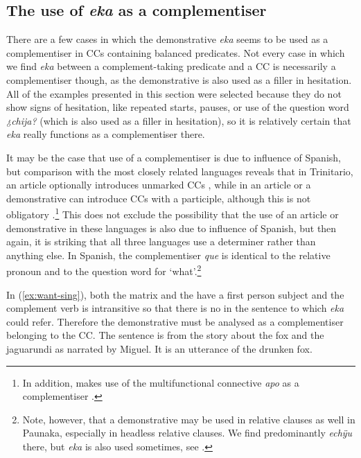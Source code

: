 \subsection{The use of \textit{eka} as a complementiser}\label{sec:CC_CMPL}

There are a few cases in which the demonstrative \textit{eka} seems to be used as a complementiser in CCs containing balanced predicates. Not every case in which we find \textit{eka} between a complement-taking predicate and a CC is necessarily a complementiser though, as the demonstrative is also used as a filler in hesitation. All of the examples presented in this section were selected because they do not show signs of hesitation, like repeated starts, pauses, or use of the question word \textit{¿chija?} (which is also used as a filler in hesitation), so it is relatively certain that \textit{eka} really functions as a complementiser there.


It may be the case that use of a complementiser is due to influence of Spanish, but comparison with the most closely related languages reveals that in Trinitario, an article optionally introduces unmarked CCs \citep[91]{Rose2014a}, while in  an article or a demonstrative can introduce CCs with a participle, although this is not obligatory \citep[424]{Danielsen2007}.\footnote{In addition,  makes use of the multifunctional connective \textit{apo} as a complementiser \citep[393]{Danielsen2007}.} This does not exclude the possibility that the use of an article or demonstrative in these languages is also due to influence of Spanish, but then again, it is striking that all three languages use a determiner rather than anything else. In Spanish, the complementiser \textit{que} is identical to the relative pronoun and to the question word for ‘what’.\footnote{Note, however, that a demonstrative may be used in relative clauses as well in Paunaka, especially in headless relative clauses. We find predominantly \textit{echÿu} there, but \textit{eka} is also used sometimes, see .}


In (\ref{ex:want-sing}), both the matrix and the  have a first person subject and the complement verb is intransitive so that there is no  in the sentence to which \textit{eka} could refer. Therefore the demonstrative must be analysed as a complementiser belonging to the CC. The sentence is from the story about the fox and the jaguarundi as narrated by Miguel. It is an utterance of the drunken fox.

